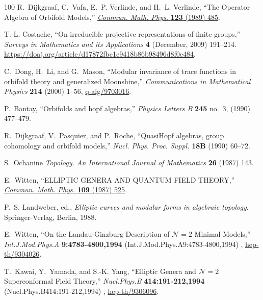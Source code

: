 \begin{thebibliography}{100}
R.~Dijkgraaf, C.~Vafa, E.~P. Verlinde, and H.~L. Verlinde, ``{The Operator
  Algebra of Orbifold Models},''
\href{http://dx.doi.org/10.1007/BF01238812}{{\em Commun. Math. Phys.}
  {\bfseries 123} (1989) 485}.

T.-L. Costache, ``On irreducible projective representations of finite groups,''
  {\em Surveys in Mathematics and its Applications} {\bfseries 4} (December,
  2009) 191--214.
  \url{https://doaj.org/article/d17872fbc1c9418b86b98496d8f0e484}.

C.~Dong, H.~Li, and G.~Mason, ``Modular invariance of trace functions in
  orbifold theory and generalized {M}oonshine,'' {\em Communications in
  Mathematical Physics} {\bfseries 214} (2000) 1--56,
  \href{http://arxiv.org/abs/q-alg/9703016}{{\ttfamily q-alg/9703016}}.

P.~Bantay, ``Orbifolds and hopf algebras,'' {\em Physics Letters B} {\bfseries
  245} no.~3, (1990) 477--479.

R.~Dijkgraaf, V.~Pasquier, and P.~Roche, ``{QuasiHopf algebras, group
  cohomology and orbifold models},''
{\em Nucl. Phys. Proc. Suppl.} {\bfseries 18B} (1990) 60--72.

S.~Ochanine {\em Topology. An International Journal of Mathematics} {\bfseries
  26} (1987) 143.

E.~Witten, ``{ELLIPTIC GENERA AND QUANTUM FIELD THEORY},''
\href{http://dx.doi.org/10.1007/BF01208956}{{\em Commun. Math. Phys.}
  {\bfseries 109} (1987) 525}.

P.~S. Landweber, ed., {\em {Elliptic curves and modular forms in algebraic
  topology}}.
\newblock Springer-Verlag, Berlin, 1988.

E.~Witten, ``{On the Landau-Ginzburg Description of $\mathcal{N}=2$ Minimal
  Models},'' {\em Int.J.Mod.Phys.A} {\bfseries 9:4783-4800,1994}
  (Int.J.Mod.Phys.A9:4783-4800,1994) ,
  \href{http://arxiv.org/abs/hep-th/9304026}{{\ttfamily hep-th/9304026}}.

T.~Kawai, Y.~Yamada, and S.-K. Yang, ``{Elliptic Genera and $\mathcal{N}=2$
  Superconformal Field Theory},'' {\em Nucl.Phys.B} {\bfseries
  414:191-212,1994} (Nucl.Phys.B414:191-212,1994) ,
  \href{http://arxiv.org/abs/hep-th/9306096}{{\ttfamily hep-th/9306096}}.


\end{thebibliography}
